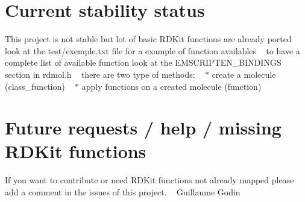  \section*{Current stability status }

This project is not stable but lot of basic R\+D\+Kit functions are already ported look at the test/exemple.\+txt file for a example of function availables ~\newline
 to have a complete list of available function look at the E\+M\+S\+C\+R\+I\+P\+T\+E\+N\+\_\+\+B\+I\+N\+D\+I\+N\+GS section in rdmol.\+h ~\newline
 there are two type of methods\+: ~\newline
$\ast$ create a molecule (class\+\_\+function) ~\newline
$\ast$ apply functions on a created molecule (function) ~\newline
 \section*{Future requests / help / missing R\+D\+Kit functions }

If you want to contribute or need R\+D\+Kit functions not already mapped please add a comment in the issues of this project. ~\newline
 Guillaume Godin 